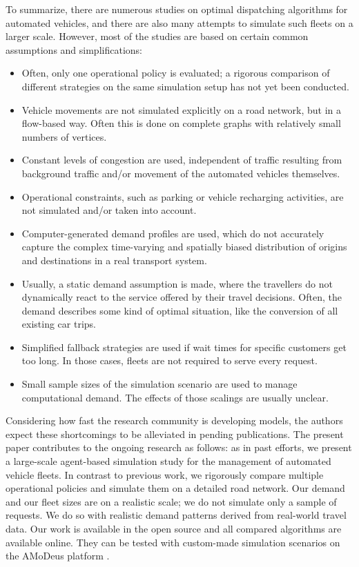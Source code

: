 To summarize, there are numerous studies on optimal dispatching algorithms for automated vehicles, and there are also many attempts to simulate such fleets on a larger scale. However, most of the studies are based on certain common assumptions and simplifications:

\begin{itemize}
    \item Often, only one operational policy is evaluated; a rigorous comparison of different strategies on the same simulation setup has not yet been conducted.
    \item Vehicle movements are not simulated explicitly on a road network, but in a flow-based way. Often this is done on complete graphs with relatively small numbers of vertices.
    \item Constant levels of congestion are used, independent of traffic resulting from background traffic and/or movement of the automated vehicles themselves.
    \item Operational constraints, such as parking or vehicle recharging activities, are not simulated and/or taken into account.
    \item Computer-generated demand profiles are used, which do not accurately capture the complex time-varying and spatially biased distribution of origins and destinations in a real transport system.
    \item Usually, a static demand assumption is made, where the travellers do not dynamically react to the service offered by their travel decisions. Often, the demand describes some kind of optimal situation, like the conversion of all existing car trips.
    \item Simplified fallback strategies are used if wait times for specific customers get too long. In those cases, fleets are not required to serve every request.
    \item Small sample sizes of the simulation scenario are used to manage  computational demand. The effects of those scalings are usually unclear.
\end{itemize}

Considering how fast the research community is developing models, the authors expect these shortcomings to be alleviated in pending publications. The present paper contributes to the ongoing research as follows: as in past efforts, we present a large-scale agent-based simulation study for the management of automated vehicle fleets. In contrast to previous work, we rigorously compare multiple operational policies and simulate them on a detailed road network.  Our demand and our fleet sizes are on a realistic scale; we do not simulate only a sample of requests. We do so with realistic demand patterns derived from real-world travel data.  Our work is available in the open source and all compared algorithms are available online. They can be tested with custom-made simulation scenarios on the AMoDeus platform \citep{amodeusBase}.






